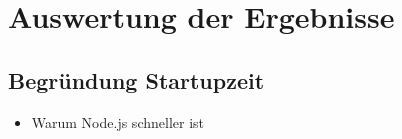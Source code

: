 \chapter{Auswertung der Ergebnisse}

\section{Begr\"undung Startupzeit}
\begin{itemize}
  \item Warum Node.js schneller ist
\end{itemize}

